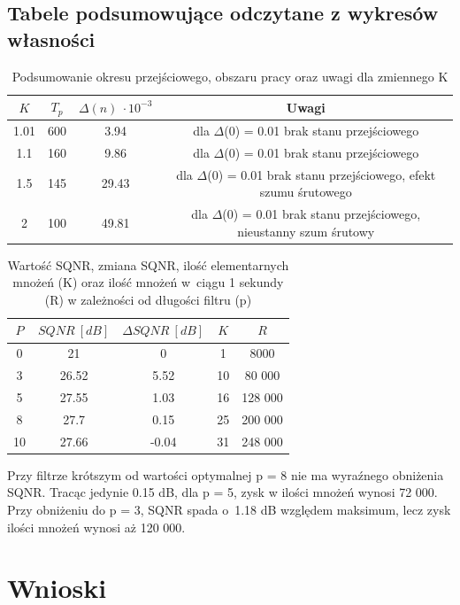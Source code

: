 \documentclass[12pt, a4paper, oneside]{article}
\begin{document}
\subsection{Tabele podsumowujące odczytane z wykresów własności}
\begin{table}[h]
  \centering
  \caption{Podsumowanie okresu przejściowego, obszaru pracy oraz uwagi dla zmiennego K}
    \begin{tabular}{|c|c|c|c|}\hline
    $K$ & $T_p$ & $\Delta(n)~\cdot 10^{-3}$ & Uwagi \\\hline
    1.01 & 600 & 3.94 & dla $\Delta$(0) = 0.01 brak stanu przejściowego \\\hline
    1.1 & 160 & 9.86 & dla $\Delta$(0) = 0.01 brak stanu przejściowego \\\hline
    1.5 & 145 & 29.43 & dla $\Delta$(0) = 0.01 brak stanu przejściowego, efekt szumu śrutowego \\\hline
    2 & 100 & 49.81 & dla $\Delta$(0) = 0.01 brak stanu przejściowego, nieustanny szum śrutowy \\\hline
    \end{tabular}%
  \label{tab:addlabel}%
\end{table}%
\begin{table}[h]
  \centering
  \caption{Wartość SQNR, zmiana SQNR, ilość elementarnych mnożeń (K) oraz ilość mnożeń w~ciągu 1 sekundy (R) w zależności od długości filtru (p)}
    \begin{tabular}{|c|c|c|c|c|}\hline
    $P$ & $SQNR~[dB]$ & $\Delta SQNR~[dB]$ & $K$ & $R$ \\\hline
    0 & 21 & 0 & 1 & 8000 \\\hline
    3 & 26.52 & 5.52 & 10 & 80 000 \\\hline
    5 & 27.55 & 1.03 & 16 & 128 000 \\\hline
    8 & 27.7 & 0.15 & 25 & 200 000 \\\hline
    10 & 27.66 & -0.04 & 31 & 248 000 \\\hline
    \end{tabular}%
  \label{tab:addlabel}%
\end{table}%
Przy filtrze krótszym od wartości optymalnej p = 8 nie ma wyraźnego obniżenia SQNR. Tracąc jedynie 0.15 dB, dla p = 5, zysk w ilości mnożeń wynosi 72 000. Przy obniżeniu do p = 3, SQNR spada o~1.18 dB względem maksimum, lecz zysk ilości mnożeń wynosi aż 120 000.
\clearpage
\section{Wnioski}
\end{document}
